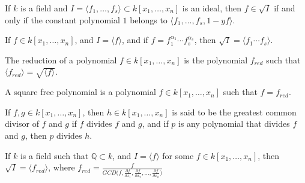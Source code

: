                \begin{theorem}
                    If $k$ is a field and
                    $I=\langle f_1,\hdots,f_s\rangle\subset k[x_1,\hdots,x_n]$
                    is an ideal, then $f\in \sqrt{I}$ if and only if
                    the constant polynomial $1$ belongs to
                    $\langle f_1,\hdots, f_s, 1-yf\rangle$.
                \end{theorem}
                \begin{theorem}
                    If $f\in k[x_1,\hdots ,x_n]$, and
                    $I=\langle f\rangle$, and if
                    $f=f_1^{\alpha_1}\cdots f_s^{\alpha_s}$,
                    then $\sqrt{I}=\langle f_1\cdots f_s\rangle$.
                \end{theorem}
                \begin{definition}
                    The reduction of a polynomial
                    $f\in k[x_1,\hdots ,x_n]$ is the polynomial
                    $f_{red}$ such that
                    $\langle f_{red}\rangle=\sqrt{\langle f\rangle}$.
                \end{definition}
                \begin{definition}
                    A square free polynomial is a polynomial
                    $f\in k[x_1,\hdots ,x_n]$ such that $f=f_{red}$.
                \end{definition}
                \begin{definition}
                    If $f,g\in k[x_1,\hdots ,x_n]$, then
                    $h\in k[x_1,\hdots ,x_n]$ is said to be the
                    greatest common divisor of $f$ and $g$ if $f$
                    divides $f$ and $g$, and if $p$ is any polynomial
                    that divides $f$ and $g$, then $p$ divides $h$.
                \end{definition}
                \begin{theorem}
                    If $k$ is a field such that $\mathbb{Q}\subset k$,
                    and $I=\langle f\rangle$ for some
                    $f\in k[x_1,\hdots ,x_n]$, then
                    $\sqrt{I}=\langle f_{red}\rangle$,
                    where
                    $f_{red}=\frac{f}{GCD%
                         \big(%
                             f,%
                             \frac{\partial f}{\partial x_1},%
                             \frac{\partial f}{\partial x_2},%
                             \hdots,%
                             \frac{\partial f}{\partial x_n}%
                         \big)}$
                \end{theorem}
